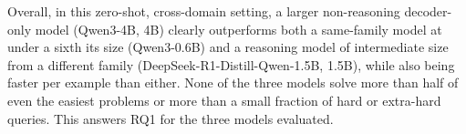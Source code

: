 Overall, in this zero-shot, cross-domain setting, a larger non-reasoning decoder-only model (Qwen3-4B, 4B) clearly outperforms both a same-family model at under a sixth its size (Qwen3-0.6B) and a reasoning model of intermediate size from a different family (DeepSeek-R1-Distill-Qwen-1.5B, 1.5B), while also being faster per example than either. None of the three models solve more than half of even the easiest problems or more than a small fraction of hard or extra-hard queries. This answers RQ1 for the three models evaluated.